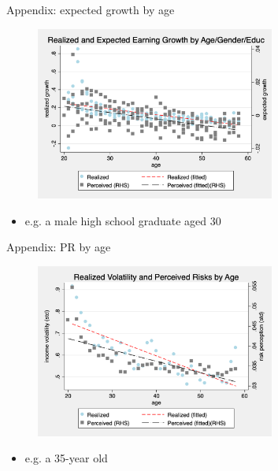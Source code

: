 \documentclass{beamer}
\begin{document}
\begin{frame}{Appendix: expected growth by age}
	\begin{figure}[ht]
		\label{appendix:age_gender_educ_level_compare_figure}
		\centering
		\includegraphics[width=0.7\textwidth]{figures/real_log_wage_shk_gr_level_by_age_edu_gender_compare.png}
	\end{figure}
	\begin{itemize}
		\item e.g. a male high school graduate aged 30 \quad  \hyperlink{age_compare}{} 
	\end{itemize}
\end{frame}



\begin{frame}{Appendix: PR by age}
	\begin{figure}[ht]
		\label{appendix:age_compare_figure}
		\centering
		\includegraphics[width=0.7\textwidth]{figures/real_log_wage_shk_gr_by_age_compare.png}
	\end{figure}
	\begin{itemize}
		\item e.g. a 35-year old   \quad  \hyperlink{age_compare}{} 
	\end{itemize}
\end{frame}
\end{document}
